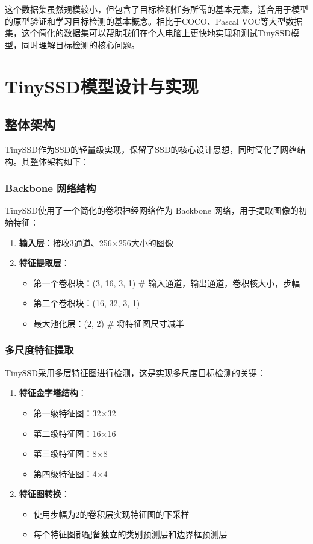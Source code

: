\documentclass[UTF8]{ctexart}
\begin{document}
这个数据集虽然规模较小，但包含了目标检测任务所需的基本元素，适合用于模型的原型验证和学习目标检测的基本概念。相比于COCO、Pascal VOC等大型数据集，这个简化的数据集可以帮助我们在个人电脑上更快地实现和测试TinySSD模型，同时理解目标检测的核心问题。

\section{TinySSD模型设计与实现}
\subsection{整体架构}

TinySSD作为SSD的轻量级实现，保留了SSD的核心设计思想，同时简化了网络结构。其整体架构如下：

\subsubsection{Backbone 网络结构}
TinySSD使用了一个简化的卷积神经网络作为 Backbone 网络，用于提取图像的初始特征：
\begin{enumerate}
    \item \textbf{输入层}：接收3通道、256$\times$256大小的图像
    \item \textbf{特征提取层}：
    \begin{itemize}
        \item 第一个卷积块：(3, 16, 3, 1) \hspace{0.5em} \# 输入通道，输出通道，卷积核大小，步幅
        \item 第二个卷积块：(16, 32, 3, 1)
        \item 最大池化层：(2, 2) \hspace{0.5em} \# 将特征图尺寸减半
    \end{itemize}
\end{enumerate}

\subsubsection{多尺度特征提取}
TinySSD采用多层特征图进行检测，这是实现多尺度目标检测的关键：
\begin{enumerate}
    \item \textbf{特征金字塔结构}：
    \begin{itemize}
        \item 第一级特征图：32$\times$32
        \item 第二级特征图：16$\times$16
        \item 第三级特征图：8$\times$8
        \item 第四级特征图：4$\times$4
    \end{itemize}
    
    \item \textbf{特征图转换}：
    \begin{itemize}
        \item 使用步幅为2的卷积层实现特征图的下采样
        \item 每个特征图都配备独立的类别预测层和边界框预测层
    \end{itemize}
\end{enumerate}
\end{document}

